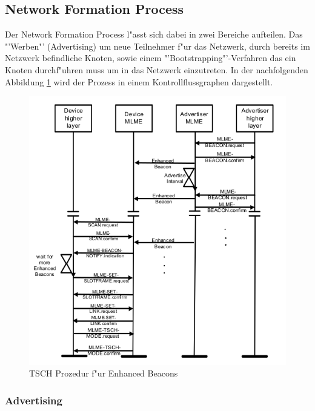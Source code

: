 \clearpage

\subsection{Network Formation Process}

Der Network Formation Process l"asst sich dabei in zwei Bereiche aufteilen. Das
"'Werben"' (Advertising) um neue Teilnehmer f"ur das Netzwerk, durch bereits im
Netzwerk befindliche Knoten, sowie einem "'Bootstrapping"'-Verfahren das ein Knoten
durchf"uhren muss um in das Netzwerk einzutreten. In der nachfolgenden Abbildung
\ref{fig:network_formation} wird der Prozess in einem Kontrollflussgraphen dargestellt.

\begin{figure}[h]
    \centering
    \includegraphics[scale=0.8]{images/tsch_advertisment.png}
    \caption{TSCH Prozedur f"ur Enhanced Beacons \cite{IEEE802154e}}
    \label{fig:network_formation}
\end{figure}

\clearpage
\subsubsection{Advertising}

